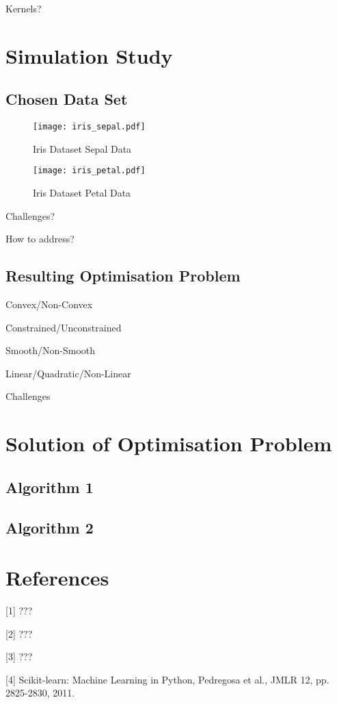 \documentclass[10pt, a4paper]{amsart}
\begin{document}
Kernels?


\section{Simulation Study}

\subsection{Chosen Data Set}\hfill

\begin{figure}
	\centering	
	\texttt{[image: iris\_sepal.pdf]}
	\caption{Iris Dataset Sepal Data}
\end{figure}

\begin{figure}
	\centering	
	\texttt{[image: iris\_petal.pdf]}
	\caption{Iris Dataset Petal Data}
\end{figure}

Challenges?

How to address?

\subsection{Resulting Optimisation Problem}\hfill

Convex/Non-Convex

Constrained/Unconstrained

Smooth/Non-Smooth

Linear/Quadratic/Non-Linear

Challenges


\section{Solution of Optimisation Problem}

\subsection{Algorithm 1}\hfill

\subsection{Algorithm 2}\hfill


\section{References}

[1] ???

[2] ???

[3] ???

[4] Scikit-learn: Machine Learning in Python, Pedregosa et al., JMLR 12, pp. 2825-2830, 2011.
\end{document}

